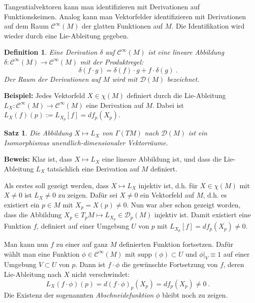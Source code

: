 \documentclass[12pt,a4paper]{article}
\def\supp{\mathrm{supp}\,}
\newtheorem{Satz}[Lemma]{Satz}
\newtheorem{Definition}[Lemma]{Definition}
\def\proof{\noindent\textbf{Beweis:}\quad}
\begin{document}
\bigskip

Tangentialvektoren kann man identifizieren mit Derivationen auf Funktionskeimen. Analog
kann man Vektorfelder identifizieren mit Derivationen auf dem Raum $\mathcal C^\infty(M)$
der glatten Funktionen auf $M$. Die Identifikation wird wieder durch eine Lie-Ableitung
gegeben.

\begin{Definition}
Eine {\em Derivation} $\delta$ auf $\mathcal C^\infty(M)$ ist eine lineare Abbildung
$\delta : \mathcal C^\infty(M)\rightarrow \mathcal C^\infty(M)$ mit der Produktregel:
$$
\delta (f\cdot g) = \delta(f) \cdot g + f \cdot \delta(g) \ .
$$
Der Raum der Derivationen auf $M$ wird mit $\mathcal D(M)$ bezeichnet.
\end{Definition}

\bigskip

{\bf Beispiel:} Jedes Vektorfeld $X\in \chi(M)$ definiert durch die Lie-Ableitung
$L_X:\mathcal C^\infty(M)\rightarrow \mathcal C^\infty(M)$ eine Derivation auf $M$.
Dabei ist $L_X(f)(p) := L_{X_p}[f] = df_p(X_p)$.

\bigskip

\begin{Satz}
Die Abbildung $X\mapsto L_X$ von $\Gamma (TM)$ nach  $\mathcal D(M)$ ist
ein Isomorphismus unendlich-dimensionaler Vektorr\"aume.
\end{Satz}
\proof
Klar ist, dass $X\mapsto L_X$ eine lineare Abbildung ist, und dass die Lie-Ableitung
$L_X$ tats\"achlich eine Derivation auf $M$ definiert.

\medskip

Als erstes soll gezeigt werden, dass $X\mapsto L_X$ injektiv ist, d.h. f\"ur $X\in \chi(M)$ mit
$X\neq 0$ ist $L_X\neq 0$ zu zeigen. Daf\"ur sei $X\neq 0$ ein Vektorfeld auf $M$, d.h. es
existiert ein $p\in M$ mit $X_p=X(p) \neq 0$. Nun war aber schon gezeigt worden, dass die
Abbildung $X_p\in T_pM \mapsto L_{X_p}\in \mathcal D_p(M)$ injektiv ist. Damit existiert
eine Funktion $f$, definiert auf einer Umgebung $U$ von $p$ mit $L_{X_p}[f]= df_p(X_p)\neq 0$.

\medskip

Man kann nun $f$ zu einer auf ganz $M$ definierten Funktion fortsetzen. Daf\"ur w\"ahlt man
eine Funktion $\phi \in \mathcal C^\infty(M) $ mit $\supp (\phi )\subset U$ und $\left. \phi \right|_V\equiv 1$
auf einer Umgebung $V\subset U$ von $p$. Dann ist $f\cdot \phi$ die gew\"unschte Fortsetzung von
$f$, deren Lie-Ableitung nach $X$ nicht verschwindet:
$$
L_X(f \cdot \phi)(p) = d(f \cdot \phi)_p(X_p)= df_p(X_p) \neq 0 \ .
$$
Die Existenz der sogenannten {\it Abschneidefunktion} $\phi$ bleibt noch zu zeigen.
\end{document}
